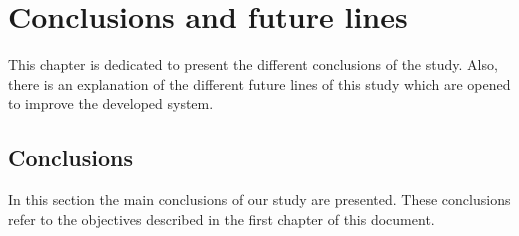 
\chapter{Conclusions and future lines}
\newpage

This chapter is dedicated to present the different conclusions of the study. Also, there is an explanation of the different future lines of this study which are opened to improve the developed system.

\section{Conclusions}

In this section the main conclusions of our study are presented. These conclusions refer to the objectives described in the first chapter of this document.

